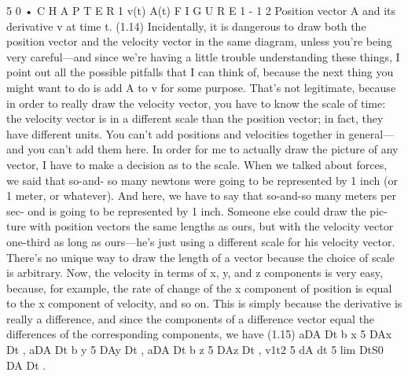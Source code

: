 \documentclass[10pt,oneside]{article}
\begin{document}
5 0 • C H A P T E R  1 v(t) A(t) F I G U R E 1 - 1 2 Position vector A and its derivative v at time t. (1.14) Incidentally, it is dangerous to draw both the position vector and the velocity vector in the same diagram, unless you’re being very careful---and since we’re having a little trouble understanding these things, I point out all the possible pitfalls that I can think of, because the next thing you might want to do is add A to v for some purpose. That’s not legitimate, because in order to really draw the velocity vector, you have to know the scale of time: the velocity vector is in a different scale than the position vector; in fact, they have different units. You can’t add positions and velocities together in general---and you can’t add them here. In order for me to actually draw the picture of any vector, I have to make a decision as to the scale. When we talked about forces, we said that so-and- so many newtons were going to be represented by 1 inch (or 1 meter, or whatever). And here, we have to say that so-and-so many meters per sec- ond is going to be represented by 1 inch. Someone else could draw the pic- ture with position vectors the same lengths as ours, but with the velocity vector one-third as long as ours---he’s just using a different scale for his velocity vector. There’s no unique way to draw the length of a vector because the choice of scale is arbitrary. Now, the velocity in terms of x, y, and z components is very easy, because, for example, the rate of change of the x component of position is equal to the x component of velocity, and so on. This is simply because the derivative is really a difference, and since the components of a difference vector equal the differences of the corresponding components, we have (1.15) aDA Dt b x 5 DAx Dt , aDA Dt b y 5 DAy Dt , aDA Dt b z 5 DAz Dt , v1t2 5 dA dt 5 lim DtS0 DA Dt .\par
\end{document}
